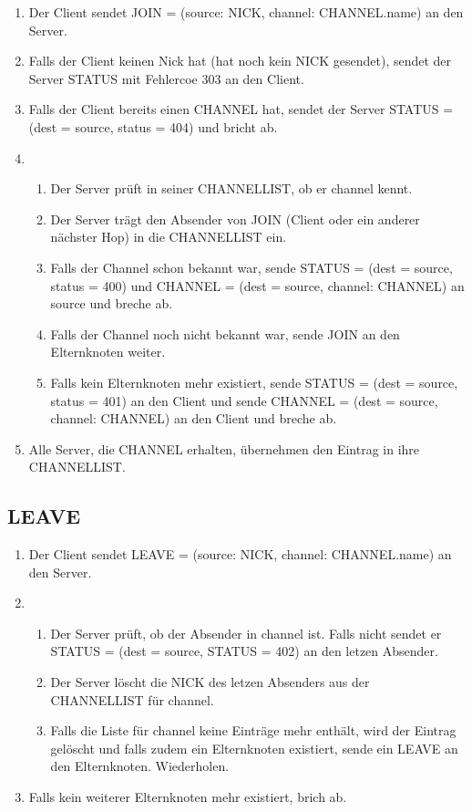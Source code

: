 \documentclass{article}
\begin{document}
\begin{enumerate}
  \item Der Client sendet JOIN = (source: NICK, channel: CHANNEL.name) an den Server.
  \item Falls der Client keinen Nick hat (hat noch kein NICK gesendet), sendet der Server STATUS mit Fehlercoe 303 an den Client.
  \item Falls der Client bereits einen CHANNEL hat, sendet der Server STATUS = (dest = source, status = 404) und bricht ab. 
  \item
    \begin{enumerate}
      \item Der Server prüft in seiner CHANNELLIST, ob er channel kennt.
      \item Der Server trägt den Absender von JOIN (Client oder ein anderer nächster Hop) in die CHANNELLIST ein.
      \item Falls der Channel schon bekannt war, sende STATUS = (dest = source, status = 400) und CHANNEL = (dest = source, channel: CHANNEL) an source und breche ab.
      \item Falls der Channel noch nicht bekannt war, sende JOIN an den Elternknoten weiter.
      \item Falls kein Elternknoten mehr existiert, sende STATUS = (dest = source, status = 401) an den Client und sende CHANNEL = (dest = source, channel: CHANNEL) an den Client und breche ab.
    \end{enumerate}
  \item Alle Server, die CHANNEL erhalten, übernehmen den Eintrag in ihre CHANNELLIST.
\end{enumerate}

\subsection{LEAVE}

\begin{enumerate}
  \item Der Client sendet LEAVE = (source: NICK, channel: CHANNEL.name) an den Server.
  \item
    \begin{enumerate}
      \item Der Server prüft, ob der Absender in channel ist. Falls nicht sendet er STATUS = (dest = source, STATUS = 402) an den letzen Absender.
      \item Der Server löscht die NICK des letzen Absenders aus der CHANNELLIST für channel.
      \item Falls die Liste für channel keine Einträge mehr enthält, wird der Eintrag gelöscht und falls zudem ein Elternknoten existiert, sende ein LEAVE an den Elternknoten. Wiederholen.
    \end{enumerate}
  \item Falls kein weiterer Elternknoten mehr existiert, brich ab.
\end{enumerate}
\end{document}
